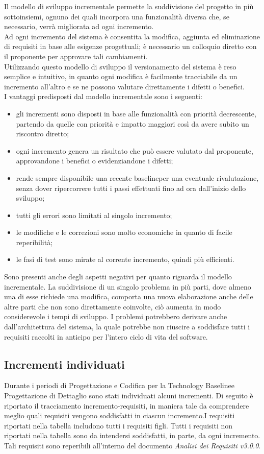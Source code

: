 Il modello di sviluppo incrementale permette la suddivisione del progetto in più sottoinsiemi,
ognuno dei quali incorpora una funzionalità diversa che, se necessario, verrà migliorata ad ogni incremento.  \\
Ad ogni incremento del sistema è consentita la modifica, aggiunta ed eliminazione di requisiti in base alle esigenze progettuali; 
è necessario un colloquio diretto con il proponente per approvare tali cambiamenti. \\
Utilizzando questo modello di sviluppo il versionamento del sistema è reso semplice e intuitivo, in quanto ogni modifica è facilmente tracciabile da un incremento all'altro e se ne possono valutare direttamente i difetti o benefici.\\
I vantaggi predisposti dal modello incrementale sono i seguenti:
\begin{itemize}
	\item gli incrementi sono disposti in base alle funzionalità con priorità decrescente, partendo da quelle con priorità e impatto maggiori
	così da avere subito un riscontro diretto;
	\item ogni incremento genera un risultato che può essere valutato dal proponente, approvandone i benefici o evidenziandone i difetti;
	\item rende sempre disponibile una recente baseline\glosp per una eventuale rivalutazione, senza dover ripercorrere tutti i passi effettuati fino ad ora dall'inizio dello sviluppo;
	\item tutti gli errori sono limitati al singolo incremento;
	\item le modifiche e le correzioni sono molto economiche in quanto di facile reperibilità;
	\item le fasi di test sono mirate al corrente incremento, quindi più efficienti.
\end{itemize}
Sono presenti anche degli aspetti negativi per quanto riguarda il modello incrementale. La suddivisione di un singolo problema in più parti, dove almeno una di esse richiede una modifica, comporta una nuova elaborazione anche delle altre parti che non sono direttamente coinvolte, ciò aumenta in modo considerevole i tempi di sviluppo.
I problemi potrebbero derivare anche dall'architettura del sistema, la quale potrebbe non riuscire a soddisfare tutti i requisiti raccolti in anticipo per l'intero ciclo di vita del software.

\subsection{Incrementi individuati}
Durante i periodi di Progettazione e Codifica per la Technology Baseline\glosp e Progettazione di Dettaglio sono stati individuati alcuni incrementi. Di seguito è riportato il tracciamento incremento-requisiti, in maniera tale da comprendere meglio quali requisiti vengono soddisfatti in ciascun incremento.I requisiti riportati nella tabella includono tutti i requisiti figli. Tutti i requisiti non riportati nella tabella sono da intendersi soddisfatti, in parte, da ogni incremento. Tali requisiti sono reperibili all’interno del documento \textit{Analisi dei Requisiti v3.0.0}.


